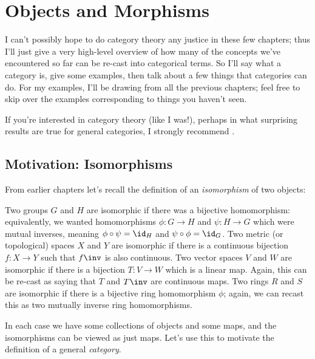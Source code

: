\chapter{Objects and Morphisms}
\label{ch:cats}
I can't possibly hope to do category theory any justice in these few chapters;
thus I'll just give a very high-level overview of how many of the concepts we've
encountered so far can be re-cast into categorical terms.
So I'll say what a category is, give some examples,
then talk about a few things that categories can do.
For my examples, I'll be drawing from all the previous chapters;
feel free to skip over the examples corresponding to things you haven't seen.

If you're interested in category theory (like I was!), perhaps in
what surprising results are true for general categories, I strongly recommend \cite{ref:msci}.

\section{Motivation: Isomorphisms}
From earlier chapters let's recall the definition of an \emph{isomorphism} of two objects:
\begin{itemize}
	\ii Two groups $G$ and $H$ are isomorphic if there was a bijective homomorphism:
	equivalently, we wanted homomorphisms $\phi : G \to H$ and $\psi : H \to G$
	which were mutual inverses, meaning $\phi \circ \psi = \id_H$ and $\psi \circ \phi = \id_G$.
	\ii Two metric (or topological) spaces $X$ and $Y$ are isomorphic
	if there is a continuous bijection $f : X \to Y$ such that $f\inv$ is also continuous.
	\ii Two vector spaces $V$ and $W$ are isomorphic if there is a bijection $T : V \to W$
	which is a linear map.
	Again, this can be re-cast as saying that $T$ and $T\inv$ are continuous maps.
	\ii Two rings $R$ and $S$ are isomorphic if there is a bijective ring homomorphism $\phi$;
	again, we can recast this as two mutually inverse ring homomorphisms.
\end{itemize}

In each case we have some collections of objects and some maps,
and the isomorphisms can be viewed as just maps.
Let's use this to motivate the definition of a general \emph{category}.

